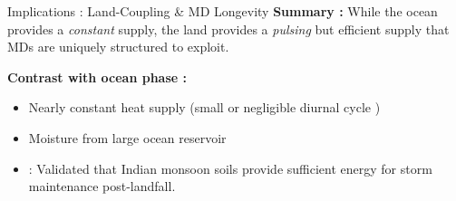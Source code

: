 \documentclass[8pt, aspectratio=169]{beamer}
\begin{document}
\begin{frame}{Implications : Land-Coupling \& MD Longevity}
    \footnotesize
    \textbf{Summary :} While the ocean provides a \textit{constant} supply, the land provides a \textit{pulsing} but efficient supply that MDs are uniquely structured to exploit.

    \footnotesize
    \textbf{Contrast with ocean phase :}
    \begin{itemize}
        \item Nearly constant heat supply (small or negligible diurnal cycle )
        \item Moisture from large ocean reservoir
    \end{itemize}

    \vfill
    \noindent\makebox[\linewidth]{\rule{\paperwidth}{0.4pt}}
    \vspace{-0.2cm}
    \tiny
    \begin{itemize}
        \item \cite{kishtawal2013tropical} : Validated that Indian monsoon soils provide sufficient energy for storm maintenance post-landfall.
    \end{itemize}
\end{frame}
\end{document}
